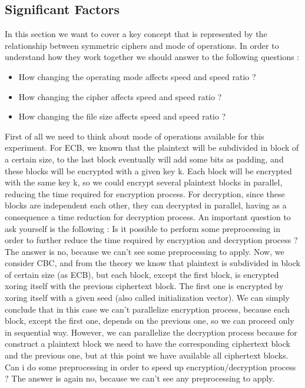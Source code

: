 \documentclass[11pt]{article}
\begin{document}
\subsection{Significant Factors}
In this section we want to cover a key concept that is represented by the relationship between symmetric ciphers and mode of operations. In order to understand how they work together we should answer to the following questions :
\begin{itemize}
\item How changing the operating mode affects speed and speed ratio ?
\item How changing the cipher affects speed and speed ratio ?
\item How changing the file size affects speed and speed ratio ?
\end{itemize}
First of all we need to think about mode of operations available for this experiment. For ECB, we known that the plaintext will be subdivided in block of a certain size, to the last block eventually will add some bits as padding, and these blocks will be encrypted with a given key k. Each block will be encrypted with the same key k, so we could encrypt several plaintext blocks in parallel, reducing the time required for encryption process. For decryption, since these blocks are independent each other, they can decrypted in parallel, having as a consequence a time reduction for decryption process. An important question to ask yourself is the following : Is it possible to perform some preprocessing in order to further reduce the time required by encryption and decryption process ? The answer is no, because we can't see some preprocessing to apply. Now, we consider CBC, and from the theory we know that plaintext is subdivided in block of certain size (as ECB), but each block, except the first block, is encrypted xoring itself with the previous ciphertext block. The first one is encrypted by xoring itself with a given seed (also called initialization vector). We can simply conclude that in this case we can't parallelize encryption process, because each block, except the first one, depends on the previous one, so we can proceed only in sequential way. However, we can parallelize the decryption process because for construct a plaintext block we need to have the corresponding ciphertext block and the previous one, but at this point we have available all ciphertext blocks. Can i do some preprocessing in order to speed up encryption/decryption process ? The answer is again no, because we can't see any preprocessing to apply.
\end{document}
